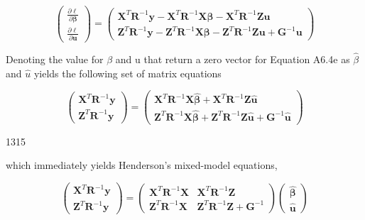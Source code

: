 \documentclass{article}
\begin{document}
\begin{equation}
\left(\begin{array}{c}\frac{\partial\ell}{\partial\boldsymbol{\beta}}\\ \frac{\partial\ell}{\partial\mathbf{u}}\end{array}\right)=\left(\begin{array}{c}\mathbf{X}^{T}\mathbf{R}^{-1}\mathbf{y}-\mathbf{X}^{T}\mathbf{R}^{-1}\mathbf{X}\boldsymbol{\beta}-\mathbf{X}^{T}\mathbf{R}^{-1}\mathbf{Z}\mathbf{u}\\ \mathbf{Z}^{T}\mathbf{R}^{-1}\mathbf{y}-\mathbf{Z}^{T}\mathbf{R}^{-1}\mathbf{X}\boldsymbol{\beta}-\mathbf{Z}^{T}\mathbf{R}^{-1}\mathbf{Z}\mathbf{u}+\mathbf{G}^{-1}\mathbf{u}\end{array}\right)
\end{equation}

Denoting the value for  $ \beta $ and u that return a zero vector for Equation A6.4e as  $ \widehat{\beta} $ and  $ \widehat{u} $ yields the following set of matrix equations

\begin{equation}
\begin{pmatrix}\mathbf{X}^{T}\mathbf{R}^{-1}\mathbf{y}\\\mathbf{Z}^{T}\mathbf{R}^{-1}\mathbf{y}\end{pmatrix}=\begin{pmatrix}\mathbf{X}^{T}\mathbf{R}^{-1}\mathbf{X}\widehat{\boldsymbol{\beta}}+\mathbf{X}^{T}\mathbf{R}^{-1}\mathbf{Z}\widehat{\mathbf{u}}\\\mathbf{Z}^{T}\mathbf{R}^{-1}\mathbf{X}\widehat{\boldsymbol{\beta}}+\mathbf{Z}^{T}\mathbf{R}^{-1}\mathbf{Z}\widehat{\mathbf{u}}+\mathbf{G}^{-1}\widehat{\mathbf{u}}\end{pmatrix}
\end{equation}

1315

which immediately yields Henderson’s mixed-model equations,

\begin{equation}
\begin{pmatrix}\mathbf{X}^{T}\mathbf{R}^{-1}\mathbf{y}\\\mathbf{Z}^{T}\mathbf{R}^{-1}\mathbf{y}\end{pmatrix}=\begin{pmatrix}\mathbf{X}^{T}\mathbf{R}^{-1}\mathbf{X}&\mathbf{X}^{T}\mathbf{R}^{-1}\mathbf{Z}\\\mathbf{Z}^{T}\mathbf{R}^{-1}\mathbf{X}&\mathbf{Z}^{T}\mathbf{R}^{-1}\mathbf{Z}+\mathbf{G}^{-1}\end{pmatrix}\begin{pmatrix}\widehat{\boldsymbol{\beta}}\\\widehat{\mathbf{u}}\end{pmatrix}
\end{equation}
\end{document}
